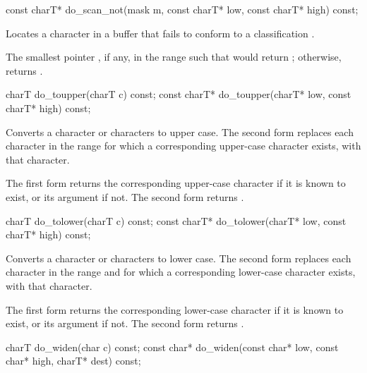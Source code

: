 %
\begin{itemdecl}
const charT* do_scan_not(mask m, const charT* low, const charT* high) const;
\end{itemdecl}

\begin{itemdescr}
\pnum
\effects
Locates a character in a buffer that fails to conform to a classification
.

\pnum
\returns
The smallest pointer , if any, in the range
such that
would return
;
otherwise, returns .
\end{itemdescr}

%
\begin{itemdecl}
charT        do_toupper(charT c) const;
const charT* do_toupper(charT* low, const charT* high) const;
\end{itemdecl}

\begin{itemdescr}
\pnum
\effects
Converts a character or characters to upper case.
The second form replaces each character
in the range
for which a corresponding upper-case character exists, with
that character.

\pnum
\returns
The first form returns the corresponding upper-case character if it
is known to exist, or its argument if not.
The second form returns .
\end{itemdescr}

%
\begin{itemdecl}
charT        do_tolower(charT c) const;
const charT* do_tolower(charT* low, const charT* high) const;
\end{itemdecl}

\begin{itemdescr}
\pnum
\effects
Converts a character or characters to lower case.
The second form replaces each character
in the range
and for which a corresponding lower-case character exists,
with that character.

\pnum
\returns
The first form returns the corresponding lower-case character if it
is known to exist, or its argument if not.
The second form returns .
\end{itemdescr}

%
\begin{itemdecl}
charT        do_widen(char c) const;
const char*  do_widen(const char* low, const char* high, charT* dest) const;
\end{itemdecl}

